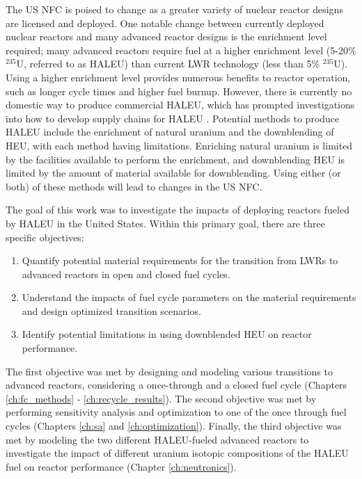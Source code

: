 The US \acrfull{NFC} is poised to change as a greater variety of 
nuclear reactor designs are licensed and deployed. One notable change 
between currently deployed nuclear reactors and many advanced 
reactor designs is the enrichment level required; many advanced 
reactors require fuel at a higher enrichment level (5-20\% $^{235}$U, 
referred to as \acrfull{HALEU}) than current \acrfull{LWR} technology 
(less than 5\% $^{235}$U). Using a higher enrichment level provides 
numerous benefits to reactor operation, such as longer cycle 
times and higher fuel burnup. However, there is currently no 
domestic way 
to produce commercial \gls{HALEU}, which has prompted investigations 
into how to develop supply chains for \gls{HALEU}
\cite{regalbuto_addressing_2020,dixon_estimated_2022}. Potential 
methods to produce \gls{HALEU} include the enrichment of natural 
uranium and the downblending of \acrfull{HEU}, with each 
method having limitations. Enriching natural 
uranium is limited by the facilities available to perform 
the enrichment, and downblending \gls{HEU} is limited by the 
amount of material available for downblending. Using either (or 
both) of these methods will lead to changes in the US \gls{NFC}. 


The goal of this work was to investigate the impacts of deploying reactors 
fueled by \gls{HALEU} in the United States. Within this primary goal, 
there are three specific objectives:
\vspace{0.2cm} 
\noindent
\begin{enumerate}
\item Quantify potential material requirements for the transition 
from \glspl{LWR} to advanced reactors in open and closed 
fuel cycles.

\item Understand the impacts of fuel cycle parameters on the material 
requirements and design optimized transition scenarios.


\item Identify potential limitations in using downblended \gls{HEU} 
on reactor performance.
\end{enumerate}

\noindent The first objective was met by designing and modeling various 
transitions 
to advanced reactors, considering a once-through and a closed 
fuel cycle (Chapters \ref{ch:fc_methods} - \ref{ch:recycle_results}). 
The second objective was met by performing sensitivity 
analysis and optimization to one of the once through fuel cycles
(Chapters \ref{ch:sa} and \ref{ch:optimization}). 
Finally, the third objective was met by modeling the two different 
\gls{HALEU}-fueled advanced reactors to investigate the impact of 
different uranium isotopic 
compositions of the \gls{HALEU} fuel on reactor performance (Chapter 
\ref{ch:neutronics}). 

